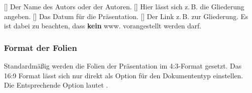 \documentclass[
    a4paper,
    12pt,
    parskip=half,
]{scrartcl}
\begin{document}
        \begin{commands}
            [] Der Name des Autors oder der Autoren.
            [] Hier lässt sich z.\,B. die Gliederung angeben.
            [] Das Datum für die Präsentation.
            [] Der Link z.\,B. zur Gliederung. Es ist dabei zu beachten, dass \textbf{kein} www. vorangestellt werden darf.
        \end{commands}

    \subsubsection{Format der Folien}
        Standardmäßig werden die Folien der Präsentation im 4:3-Format gesetzt. Das 16:9 Format lässt sich nur direkt als Option für den Dokumententyp  einstellen. Die Entsprechende Option lautet .

\end{document}
